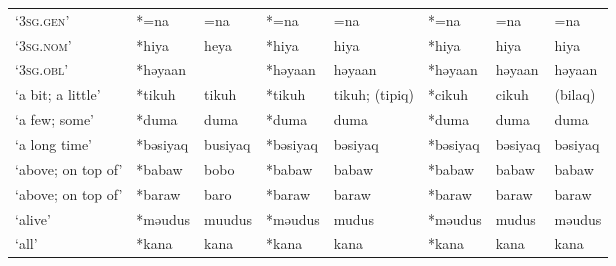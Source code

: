 \begin{landscape}
\begin{longtable}[c]{@{}p{3cm}<{\raggedright}p{2.75cm}<{\raggedright}p{2.75cm}<{\raggedright}p{2.75cm}<{\raggedright}p{2.75cm}<{\raggedright}p{2.75cm}<{\raggedright}p{2.75cm}<{\raggedright}p{2.75cm}<{\raggedright}@{}}
`\textsc{3sg.gen}'                                   & *=na               & =na                            & *=na               & =na                        & *=na             & =na                      & =na                               \\
`\textsc{3sg.nom}'                                   & *hiya              & heya                           & *hiya              & hiya                       & *hiya            & hiya                     & hiya                              \\
`\textsc{3sg.obl}'                                   & *həyaan            &                                & *həyaan            & həyaan                     & *həyaan          & həyaan                   & həyaan                            \\
`a bit; a little'                                    & *tikuh             & tikuh                          & *tikuh             & tikuh; (tipiq)             & *cikuh           & cikuh                    & (bilaq)                           \\
`a few; some'                                        & *duma              & duma                           & *duma              & duma                       & *duma            & duma                     & duma                              \\
`a long time'                                        & *bəsiyaq           & busiyaq                        & *bəsiyaq           & bəsiyaq                    & *bəsiyaq         & bəsiyaq                  & bəsiyaq                           \\
`above; on top of'                                   & *babaw             & bobo                           & *babaw             & babaw                      & *babaw           & babaw                    & babaw                             \\
`above; on top of'                                   & *baraw             & baro                           & *baraw             & baraw                      & *baraw           & baraw                    & baraw                             \\
`alive'                                              & *məudus            & muudus                         & *məudus            & mudus                      & *məudus          & mudus                    & məudus                            \\
`all'                                                & *kana              & kana                           & *kana              & kana                       & *kana            & kana                     & kana                              \\

\end{longtable}
\end{landscape}
